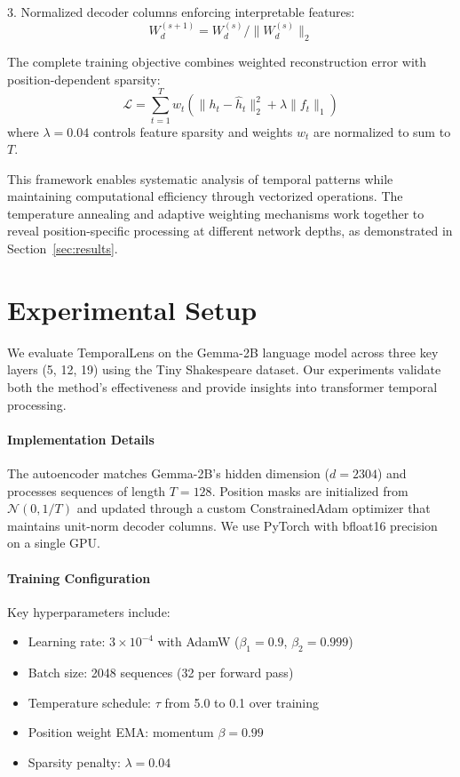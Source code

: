\documentclass{article} %
\begin{document}
3. Normalized decoder columns enforcing interpretable features:
\begin{equation}
    W_d^{(s+1)} = W_d^{(s)}/\|W_d^{(s)}\|_2
\end{equation}

The complete training objective combines weighted reconstruction error with position-dependent sparsity:
\begin{equation}
    \mathcal{L} = \sum_{t=1}^T w_t (\|h_t - \hat{h}_t\|_2^2 + \lambda \|f_t\|_1)
\end{equation}
where $\lambda=0.04$ controls feature sparsity and weights $w_t$ are normalized to sum to $T$.

This framework enables systematic analysis of temporal patterns while maintaining computational efficiency through vectorized operations. The temperature annealing and adaptive weighting mechanisms work together to reveal position-specific processing at different network depths, as demonstrated in Section~\ref{sec:results}.

\section{Experimental Setup}
\label{sec:experimental}

We evaluate TemporalLens on the Gemma-2B language model across three key layers (5, 12, 19) using the Tiny Shakespeare dataset. Our experiments validate both the method's effectiveness and provide insights into transformer temporal processing.

\paragraph{Implementation Details} The autoencoder matches Gemma-2B's hidden dimension ($d=2304$) and processes sequences of length $T=128$. Position masks are initialized from $\mathcal{N}(0, 1/T)$ and updated through a custom ConstrainedAdam optimizer that maintains unit-norm decoder columns. We use PyTorch with bfloat16 precision on a single GPU.

\paragraph{Training Configuration} Key hyperparameters include:
\begin{itemize}
    \item Learning rate: $3 \times 10^{-4}$ with AdamW ($\beta_1=0.9$, $\beta_2=0.999$)
    \item Batch size: 2048 sequences (32 per forward pass)
    \item Temperature schedule: $\tau$ from 5.0 to 0.1 over training
    \item Position weight EMA: momentum $\beta=0.99$
    \item Sparsity penalty: $\lambda=0.04$
\end{itemize}
\end{document}
